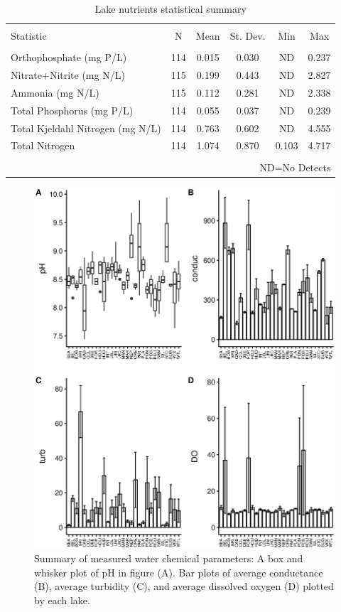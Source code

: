  \begin{table}[!ht]
    \centering
    \caption{Lake nutrients statistical summary}
    \label{}
  \begin{tabular}{@{\extracolsep{5pt}}lccccc}
  \\[-1.8ex]\hline
  \hline \\[-1.8ex]
  Statistic & \multicolumn{1}{c}{N} & \multicolumn{1}{c}{Mean} & \multicolumn{1}{c}{St. Dev.} & \multicolumn{1}{c}{Min} & \multicolumn{1}{c}{Max} \\
  \hline \\[-1.8ex]
   Orthophosphate (mg P/L) & 114 & 0.015 & 0.030 & ND & 0.237 \\
  Nitrate+Nitrite (mg N/L) & 115 & 0.199 & 0.443 & ND & 2.827 \\
  Ammonia (mg N/L)  & 115 & 0.112 & 0.281 & ND & 2.338 \\
  Total Phosphorus (mg P/L) & 114 & 0.055 & 0.037 & ND & 0.239 \\
  Total Kjeldahl Nitrogen (mg N/L) & 114 & 0.763 & 0.602 & ND & 4.555 \\
  Total Nitrogen & 114 & 1.074 & 0.870 & 0.103 & 4.717 \\
  \hline \\[-1.8ex]
  \multicolumn{6}{r}{ND=No Detects} \\
  \end{tabular}
  \end{table}

  \begin{figure}[!hp]
  \centering
    \includegraphics[width=\textwidth]{figures/watboxplotlake.eps}
    \caption{Summary of measured water chemical parameters: A box and whisker plot of pH in figure (A). Bar plots of average conductance (B), average turbidity (C), and average dissolved oxygen (D) plotted by each lake. }
  \end{figure}
